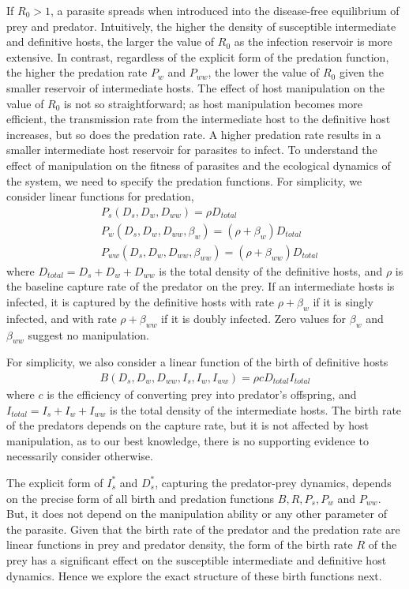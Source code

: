 \documentclass[11pt]{article}
\begin{document}
If $R_0 > 1$, a parasite spreads when introduced into the disease-free equilibrium of prey and predator.
Intuitively, the higher the density of susceptible intermediate and definitive hosts, the larger the value of $R_0$ as the infection reservoir is more extensive. 
In contrast, regardless of the explicit form of the predation function, the higher the predation rate $P_w$ and $P_{ww}$, the lower the value of $R_0$ given the smaller reservoir of intermediate hosts. 
The effect of host manipulation on the value of $R_0$ is not so straightforward; as host manipulation becomes more efficient, the transmission rate from the intermediate host to the definitive host increases, but so does the predation rate. 
A higher predation rate results in a smaller intermediate host reservoir for parasites to infect. 
To understand the effect of manipulation on the fitness of parasites and the ecological dynamics of the system, we need to specify the predation functions. 
For simplicity, we consider linear functions for predation,
%
\begin{align*}
& P_s(D_s, D_w, D_{ww}) = \rho D_{total}  \\
& P_w(D_s, D_w, D_{ww}, \beta_w) = (\rho + \beta_w) D_{total} \\
& P_{ww}(D_s, D_w, D_{ww}, \beta_{ww}) =  (\rho + \beta_{ww})D_{total}
\end{align*}
%
where $D_{total} = D_s + D_w + D_{ww}$ is the total density of the definitive hosts, and $\rho$ is the baseline capture rate of the predator on the prey. If an intermediate hosts is infected, it is captured by the definitive hosts with rate $\rho + \beta_w$ if it is singly infected, and with rate $\rho + \beta_{ww}$ if it is doubly infected. Zero values for $\beta_w$ and $\beta_{ww}$ suggest no manipulation. 

For simplicity, we also consider a linear function of the birth of definitive hosts
%
\begin{align*}
B(D_s, D_w, D_{ww}, I_s, I_w, I_{ww}) = \rho c D_{total} I_{total}
\end{align*}
%
where $c$ is the efficiency of converting prey into predator's offspring, and $I_{total} = I_s + I_w + I_{ww}$ is the total density of the intermediate hosts.
The birth rate of the predators depends on the capture rate, but it is not affected by host manipulation, as to our best knowledge, there is no supporting evidence to necessarily consider otherwise.

The explicit form of $I_s^*$ and $D_s^*$, capturing the predator-prey dynamics, depends on the precise form of all birth and predation functions $B, R, P_s, P_w$ and $P_{ww}$.
But, it does not depend on the manipulation ability or any other parameter of the parasite. 
Given that the birth rate of the predator and the predation rate are linear functions in prey and predator density, the form of the birth rate $R$ of the prey has a significant effect on the susceptible intermediate and definitive host dynamics.
Hence we explore the exact structure of these birth functions next.
\end{document}
